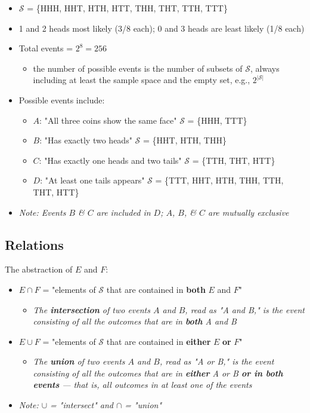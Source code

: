 \documentclass[12pt]{article}
\begin{document}
\begin{itemize}
    \item $\mathcal{S}$ = \{HHH, HHT, HTH, HTT, THH, THT, TTH, TTT\}
    \item 1 and 2 heads most likely (3/8 each); 0 and 3 heads are least likely (1/8 each)
    \item Total events = $2^8 = 256$
    \begin{itemize}
        \item the number of possible events is the number of subsets of $\mathcal{S}$, always including at least the sample space and the empty set, e.g., $2^\mathcal{|S|}$ 
    \end{itemize}
    \item Possible events include:
    \begin{itemize}
        \item $A$: "All three coins show the same face" $\mathcal{S}$ = \{HHH, TTT\}
        \item $B$: "Has exactly two heads" $\mathcal{S}$ = \{HHT, HTH, THH\}
        \item $C$: "Has exactly one heads and two tails" $\mathcal{S}$ = \{TTH, THT, HTT\}
        \item $D$: "At least one tails appears" $\mathcal{S}$ = \{TTT, HHT, HTH, THH, TTH, THT, HTT\}
    \end{itemize}
    \item[] \textit{Note: Events $B$ \& $C$ are included in $D$; $A$, $B$, \& $C$ are mutually exclusive} 
\end{itemize}

\subsection{Relations}

\begin{description}
    \item[The abstraction of $E$ and $F$:] 
\end{description}
\begin{itemize}
    \item $E \cap F$ = "elements of $\mathcal{S}$ that are contained in \textbf{both} $E$ and $F$" 
    \begin{itemize}
        \item [] \textit{The \textbf{intersection} of two events $A$ and $B$, read as "A and B," is the event consisting of all the outcomes that are in \textbf{both} A and B}
    \end{itemize}
    \item $E \cup F$ = "elements of $\mathcal{S}$ that are contained in \textbf{either} $E$ \textbf{or} $F$"
    \begin{itemize}
        \item [] \textit{The \textbf{union} of two events $A$ and $B$, read as "A or B," is the event consisting of all the outcomes that are in \textbf{either} A or B \textbf{or in both events} — that is, all outcomes in at least one of the events}
    \end{itemize}
    \item[] \textit{Note: $\cup$ = "intersect" and $\cap$ = "union"}
\end{itemize}
\end{document}
